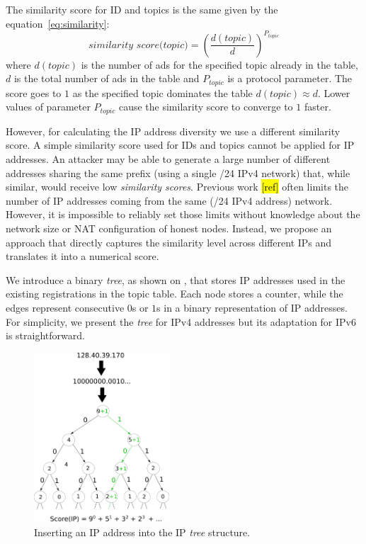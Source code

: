 The similarity score for ID and topics is the same given by the equation~\ref{eq:similarity}:
\begin{equation}
\label{eq:similarity}
    \textit{similarity score(topic)}= (\frac{d(topic)}{d})^{P_{topic}} 
\end{equation}
where $d(topic)$ is the number of ads for the specified topic already in the table, $d$ is the total number of ads in the table and $P_{topic}$ is a protocol parameter. 
The score goes to $1$ as the specified topic dominates the table $d(topic)  \approx  d$. 
Lower values of parameter $P_{topic}$ cause the similarity score to converge to $1$ faster. 

However,  for calculating the IP address diversity we use a different similarity score. 
A simple similarity score used for IDs and topics cannot be applied for IP addresses. 
An attacker may be able to generate a large number of different addresses sharing the same prefix (\eg using a single /24 IPv4 network) that, while similar, would receive low \emph{similarity scores}. 
Previous work \hl{[ref]} often limits the number of IP addresses coming from the same (\eg /24 IPv4 address) network. 
However,  it is impossible to reliably set those limits without knowledge about the network size or NAT configuration of honest nodes. 
Instead, we propose an approach that directly captures the similarity level across different IPs and translates it into a numerical score. 

We introduce a binary \emph{tree},  as shown on ,  that stores IP addresses used in the existing registrations in the topic table. 
Each node stores a counter,  while the edges represent consecutive $0$s or $1$s in a binary representation of IP addresses. 
For simplicity,  we present the \emph{tree} for IPv4 addresses but its adaptation for IPv6 is straightforward. 

\begin{figure}
    \includegraphics[width=0.45\textwidth]{img/ip_tree}
    \caption{Inserting an IP address into the IP \emph{tree} structure.}
    \label{fig:ip_tree}
\end{figure}

